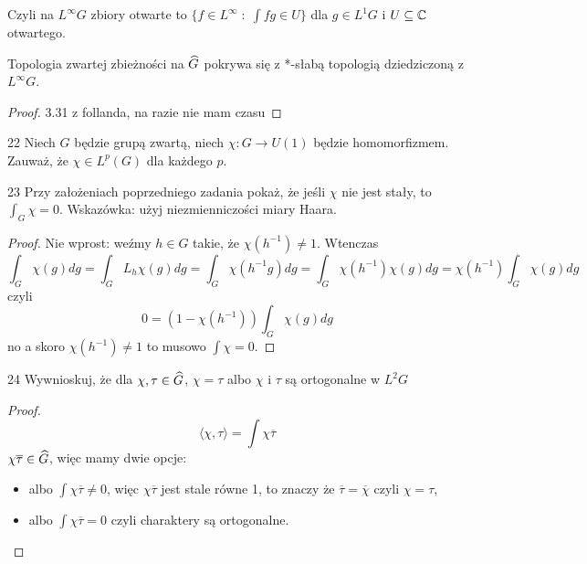 Czyli na $L^\infty G$ zbiory otwarte to $\{f\in L^\infty\;:\;\int fg\in U\}$ dla $g\in L^1G$ i $U\subseteq \C$ otwartego.

\begin{theorem}{}{}
  Topologia zwartej zbieżności na $\Hat{G}$ pokrywa się z *-słabą topologią dziedziczoną z $L^\infty G$.
\end{theorem}

\begin{proof}\color{red}
  3.31 z follanda, na razie nie mam czasu
\end{proof}

\begin{zadanie}{2}{2}
  Niech $G$ będzie grupą zwartą, niech $\chi:G\to U(1)$ będzie homomorfizmem. Zauważ, że $\chi\in L^p(G)$ dla każdego $p$.
\end{zadanie}

\begin{zadanie}{2}{3}
  Przy założeniach poprzedniego zadania pokaż, że jeśli $\chi$ nie jest stały, to $\int_G\chi=0$. Wskazówka: użyj niezmienniczości miary Haara.
\end{zadanie}

\begin{proof}
  Nie wprost: weźmy $h\in G$ takie, że $\chi(h^{-1})\neq 1$. Wtenczas 
  $$\int_G\chi(g)dg=\int_GL_h\chi(g)dg=\int_G\chi(h^{-1}g)dg=\int_G\chi(h^{-1})\chi(g)dg=\chi(h^{-1})\int_G\chi(g)dg$$
  czyli
  $$0=(1-\chi(h^{-1}))\int_G\chi(g)dg$$
  no a skoro $\chi(h^{-1})\neq 1$ to musowo $\int\chi=0$.
\end{proof}

\begin{zadanie}{2}{4}\label{2:4}
  Wywnioskuj, że dla $\chi,\tau\in\Hat{G}$, $\chi=\tau$ albo $\chi$ i $\tau$ są ortogonalne w $L^2G$
\end{zadanie}

\begin{proof}
  $$\langle \chi, \tau\rangle = \int\chi\overline{\tau}$$
  $\chi\overline{\tau}\in\Hat{G}$, więc mamy dwie opcje: 
  \begin{itemize}
    \item albo $\int \chi\overline{\tau}\neq 0$, więc $\chi\overline{\tau}$ jest stale równe 1, to znaczy że $\overline{\tau}=\overline{\chi}$ czyli $\chi=\tau$, 
    \item albo $\int \chi\overline{\tau}=0$ czyli charaktery są ortogonalne.
  \end{itemize}
\end{proof}


